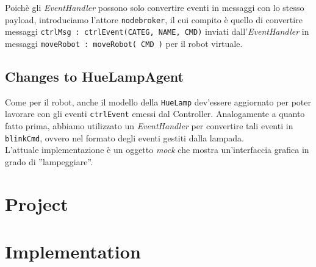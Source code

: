 \documentclass{../llncs}
\newcommand{\codescript}[1]{{\mbox{\small{\texttt{#1}}}}\xspace}
\newcommand{\labelsec}[1]{\label{sec:#1}}
\begin{document}
 

Poichè gli \emph{EventHandler} possono solo convertire eventi in messaggi con lo stesso payload, introduciamo l'attore \texttt{nodebroker}, il cui compito è quello di convertire messaggi \codescript{ctrlMsg : ctrlEvent(CATEG, NAME, CMD)} inviati dall'\emph{EventHandler} in messaggi \codescript{moveRobot : moveRobot( CMD )} per il robot virtuale.

 

\subsection{Changes to HueLampAgent}
Come per il robot, anche il modello della \texttt{HueLamp} dev'essere aggiornato per poter lavorare con gli eventi \codescript{ctrlEvent} emessi dal Controller. Analogamente a quanto fatto prima, abbiamo utilizzato un \emph{EventHandler} per convertire tali eventi in \codescript{blinkCmd}, ovvero nel formato degli eventi gestiti dalla lampada.\\

L'attuale implementazione è un oggetto \emph{mock} che mostra un'interfaccia grafica in grado di ''lampeggiare''.

 



\section{Project}
\labelsec{Project}

\section{Implementation}
\labelsec{Implementation}
\end{document}
